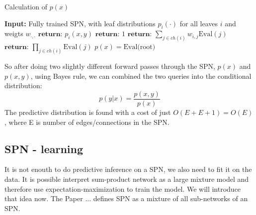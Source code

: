 \begin{algorithm}[H]
    \caption*{Calculation of $p(x)$}\label{SPN}
    \begin{algorithmic}
    \State \textbf{Input:} Fully trained SPN, with leaf distributions $p_i(\cdot)$ for all leaves $i$ and weigts $w_{\cdot,\cdot}$ 
            \State  $\textbf{return: } p_i(x,y)$ 
        \Else 
            \State  $\textbf{return: } 1$ 
        \EndIf
    \EndIf
        \State $\textbf{return: } \sum_{j\in ch(i)} w_{i,j} \text{Eval}(j)$
    \EndIf
        \State $\textbf{return: } \prod_{j \in ch(i)} \text{Eval}(j)$
    \EndIf
    \EndFunction
    \State $p(x) =  \text{Eval(root)}$
    \end{algorithmic}
\end{algorithm}

So after doing two slightly different forward passes through the SPN, 
$p(x)$ and $p(x,y)$, using Bayes rule,
we can combined the two queries into the conditional distribution: 
$$p(y|x) = \frac{p(x,y)}{p(x)}$$
The predictive distribution is found with a cost of just $O(E+E+1) = O(E)$, where E is number
of edges/connections in the SPN. 

\subsection{SPN - learning}
It is not enouth to do predictive inference on a SPN, we also need to fit it on
the data. It is possible interpret sum-product network as a large mixture model 
and therefore use expectation-maximization to train the model. 
We will introduce that idea now. The Paper \cite{SPN_EM}... %
defines SPN as a mixture of all sub-networks of an SPN.

